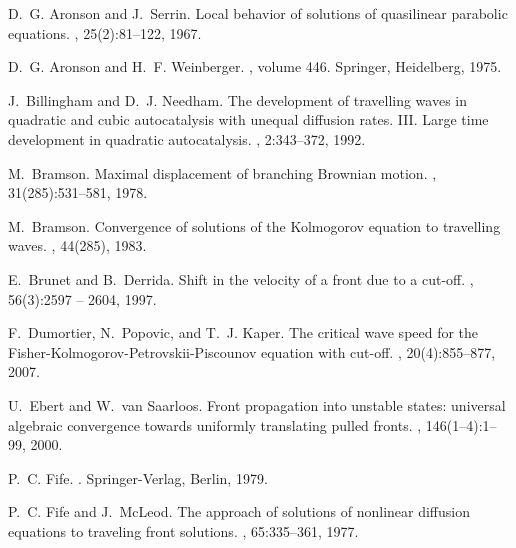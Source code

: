 \documentclass[11pt,a4paper]{article}
\begin{document}

\providecommand{\noopsort}[1]{}\providecommand{\singleletter}[1]{#1}%
\begin{thebibliography}{10}

D.~G. Aronson and J.~Serrin.
\newblock Local behavior of solutions of quasilinear parabolic equations.
, 25(2):81--122, 1967.

D.~G. Aronson and H.~F. Weinberger.
, volume 446.
\newblock Springer, Heidelberg, 1975.

J.~Billingham and D.~J. Needham.
\newblock The development of travelling waves in quadratic and cubic
  autocatalysis with unequal diffusion rates. {III}. {L}arge time development
  in quadratic autocatalysis.
, 2:343--372, 1992.

M.~Bramson.
\newblock Maximal displacement of branching {B}rownian motion.
, 31(285):531--581, 1978.

M.~Bramson.
\newblock Convergence of solutions of the {K}olmogorov equation to travelling
  waves.
, 44(285), 1983.

E.~Brunet and B.~Derrida.
\newblock Shift in the velocity of a front due to a cut-off.
, 56(3):2597 -- 2604, 1997.

F.~Dumortier, N.~Popovic, and T.~J. Kaper.
\newblock The critical wave speed for the
  {F}isher-{K}olmogorov-{P}etrovskii-{P}iscounov equation with cut-off.
, 20(4):855--877, 2007.

U.~Ebert and W.~van Saarloos.
\newblock Front propagation into unstable states: universal algebraic
  convergence towards uniformly translating pulled fronts.
, 146(1--4):1--99, 2000.

P.~C. Fife.
.
\newblock Springer-Verlag, Berlin, 1979.

P.~C. Fife and J.~McLeod.
\newblock The approach of solutions of nonlinear diffusion equations to
  traveling front solutions.
, 65:335--361, 1977.


\end{thebibliography}
\end{document}
